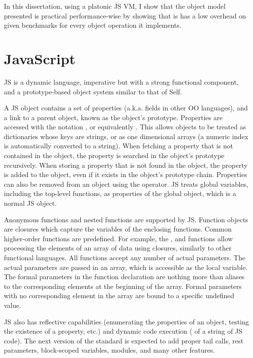 In this dissertation, using a platonic JS VM, I show that the object model
presented is practical performance-wise by showing that is has a low
overhead on given benchmarks for every object operation it implements. 

\section{JavaScript}

JS is a dynamic language, imperative but with a strong functional component,
and a prototype-based object system similar to that of Self.

A JS object contains a set of properties (a.k.a. fields in other OO languages),
and a link to a parent object, known as the object's prototype. Properties are
accessed with the notation , or equivalently .
This allows objects to be treated as dictionaries whose keys are strings, or as
one dimensional arrays (a numeric index is automatically converted to a
string).  When fetching a property that is not contained in the object, the
property is searched in the object's prototype recursively. When storing a
property that is not found in the object, the property is added to the object,
even if it exists in the object's prototype chain. Properties can also be
removed from an object using the  operator. JS treats global
variables, including the top-level functions, as properties of the global
object, which is a normal JS object.

Anonymous functions and nested functions are supported by JS. Function objects
are closures which capture the variables of the enclosing functions. Common
higher-order functions are predefined. For example, the , 
and  functions allow processing the elements of an array of data
using closures, similarly to other functional languages. All functions accept
any number of actual parameters. The actual parameters are passed in an array,
which is accessible as the  local variable. The formal parameters
in the function declaration are nothing more than aliases to the corresponding
elements at the beginning of the array. Formal parameters with no corresponding
element in the array are bound to a specific undefined value.

JS also has reflective capabilities (enumerating the properties of an object,
testing the existence of a property, etc.) and dynamic code execution
( of a string of JS code).  The next version of the standard is
expected to add proper tail calls, rest parameters, block-scoped variables,
modules, and many other features.

